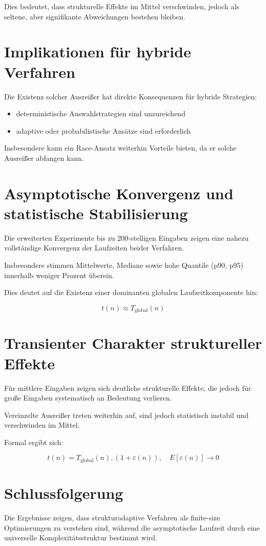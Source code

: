 \documentclass[11pt,a4paper]{article}
\begin{document}
Dies bedeutet, dass strukturelle Effekte im Mittel verschwinden, jedoch als seltene, aber signifikante Abweichungen bestehen bleiben.

\section{Implikationen für hybride Verfahren}

Die Existenz solcher Ausreißer hat direkte Konsequenzen für hybride Strategien:

\begin{itemize}
	\item deterministische Auswahlstrategien sind unzureichend
	\item adaptive oder probabilistische Ansätze sind erforderlich
\end{itemize}

Insbesondere kann ein Race-Ansatz weiterhin Vorteile bieten, da er solche Ausreißer abfangen kann.

\section{Asymptotische Konvergenz und statistische Stabilisierung}

Die erweiterten Experimente bis zu 200-stelligen Eingaben zeigen eine nahezu vollständige Konvergenz der Laufzeiten beider Verfahren.

Insbesondere stimmen Mittelwerte, Mediane sowie hohe Quantile (p90, p95) innerhalb weniger Prozent überein.

Dies deutet auf die Existenz einer dominanten globalen Laufzeitkomponente hin:

\begin{equation}
	t(n) \approx T_{\text{global}}(n)
\end{equation}

\section{Transienter Charakter struktureller Effekte}

Für mittlere Eingaben zeigen sich deutliche strukturelle Effekte, die jedoch für große Eingaben systematisch an Bedeutung verlieren.

Vereinzelte Ausreißer treten weiterhin auf, sind jedoch statistisch instabil und verschwinden im Mittel.

Formal ergibt sich:

\begin{equation}
	t(n) = T_{\text{global}}(n),(1 + \varepsilon(n)), \quad E[\varepsilon(n)] \to 0
\end{equation}

\section{Schlussfolgerung}

Die Ergebnisse zeigen, dass strukturadaptive Verfahren als finite-size Optimierungen zu verstehen sind, während die asymptotische Laufzeit durch eine universelle Komplexitätsstruktur bestimmt wird.
\end{document}
